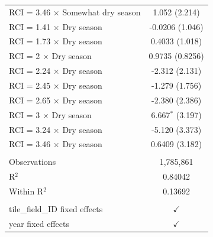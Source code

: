 \begin{table}[H]
\begin{tabular}{lc}
      RCI = 3.46 $\times$ Somewhat dry season  & 1.052 (2.214)\\   
      RCI = 1.41 $\times$ Dry season           & -0.0206 (1.046)\\   
      RCI = 1.73 $\times$ Dry season           & 0.4033 (1.018)\\   
      RCI = 2 $\times$ Dry season              & 0.9735 (0.8256)\\   
      RCI = 2.24 $\times$ Dry season           & -2.312 (2.131)\\   
      RCI = 2.45 $\times$ Dry season           & -1.279 (1.756)\\   
      RCI = 2.65 $\times$ Dry season           & -2.380 (2.386)\\   
      RCI = 3 $\times$ Dry season              & 6.667$^{*}$ (3.197)\\   
      RCI = 3.24 $\times$ Dry season           & -5.120 (3.373)\\   
      RCI = 3.46 $\times$ Dry season           & 0.6409 (3.182)\\   
       \\
      Observations                             & 1,785,861\\  
      R$^2$                                    & 0.84042\\  
      Within R$^2$                             & 0.13692\\  
       \\
      tile\_field\_ID fixed effects            & $\checkmark$\\   
      year fixed effects                       & $\checkmark$\\   
      \bottomrule
   \end{tabular}
\end{table}


